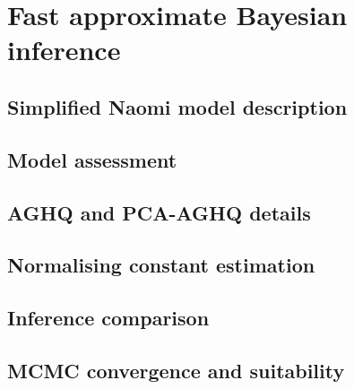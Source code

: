\documentclass[a4paper, nobind]{templates/ociamthesis}
\begin{document}
\hypertarget{fast-approximate-bayesian-inference}{%
\chapter{Fast approximate Bayesian inference}\label{fast-approximate-bayesian-inference}}

\hypertarget{simplified-naomi-model-description}{%
\section{Simplified Naomi model description}\label{simplified-naomi-model-description}}

\hypertarget{model-assessment-1}{%
\section{Model assessment}\label{model-assessment-1}}

\hypertarget{aghq-and-pca-aghq-details}{%
\section{AGHQ and PCA-AGHQ details}\label{aghq-and-pca-aghq-details}}

\hypertarget{normalising-constant-estimation}{%
\section{Normalising constant estimation}\label{normalising-constant-estimation}}

\hypertarget{inference-comparison-1}{%
\section{Inference comparison}\label{inference-comparison-1}}

\hypertarget{mcmc-convergence-and-suitability}{%
\section{MCMC convergence and suitability}\label{mcmc-convergence-and-suitability}}
\end{document}
